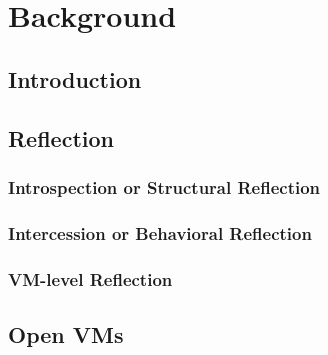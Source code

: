 
\chapter{Background}
\minitoc
\section{Introduction}

\section{Reflection}

\subsection{Introspection or Structural Reflection}


\subsection{Intercession or Behavioral Reflection}


\subsection{VM-level Reflection}

\section{Open VMs}

